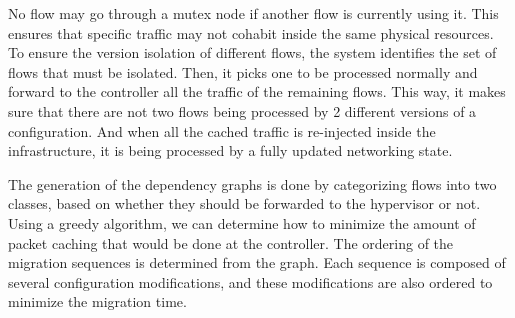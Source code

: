 No flow may go through a mutex node if another flow is currently using it.
This ensures that specific traffic may not cohabit inside the same physical resources.
To ensure the version isolation of different flows, the system identifies the set of flows that must be isolated. Then, it picks one to be processed normally and forward to the controller all the traffic of the remaining flows. This way, it makes sure that there are not two flows being processed by 2 different versions of a configuration. And when all the cached traffic is re-injected inside the infrastructure, it is being processed by a fully updated networking state.

The generation of the dependency graphs is done by categorizing flows into two classes, based on whether they should be forwarded to the hypervisor or not. Using a greedy algorithm, we can determine how to minimize the amount of packet caching that would be done at the controller.
The ordering of the migration sequences is determined from the graph. Each sequence is composed of several configuration modifications, and these modifications are also ordered to minimize the migration time. 

